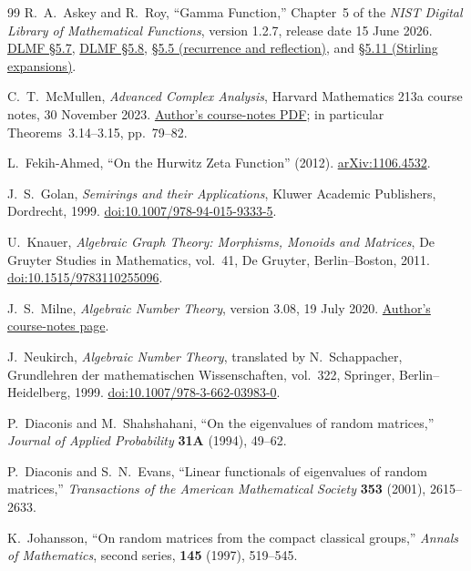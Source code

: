 \begin{thebibliography}{99}
R.~A.~Askey and R.~Roy,
\textquotedblleft{}Gamma Function,''
Chapter~5 of the \emph{NIST Digital Library of Mathematical Functions},
version 1.2.7, release date 15 June 2026.
\href{https://dlmf.nist.gov/5.7}{DLMF \S5.7},
\href{https://dlmf.nist.gov/5.8}{DLMF \S5.8},
\href{https://dlmf.nist.gov/5.5}{\S5.5 (recurrence and reflection)}, and
\href{https://dlmf.nist.gov/5.11}{\S5.11 (Stirling expansions)}.

C.~T.~McMullen,
\emph{Advanced Complex Analysis},
Harvard Mathematics 213a course notes, 30 November 2023.
\href{https://people.math.harvard.edu/~ctm/home/text/class/harvard/213a/23/html/home/course/course.pdf}
{Author's course-notes PDF}; in particular Theorems~3.14--3.15,
pp.~79--82.

L.~Fekih-Ahmed,
\textquotedblleft{}On the Hurwitz Zeta Function'' (2012).
\href{https://arxiv.org/abs/1106.4532}{arXiv:1106.4532}.

J.~S.~Golan,
\emph{Semirings and their Applications},
Kluwer Academic Publishers, Dordrecht, 1999.
\href{https://doi.org/10.1007/978-94-015-9333-5}{doi:10.1007/978-94-015-9333-5}.

U.~Knauer,
\emph{Algebraic Graph Theory: Morphisms, Monoids and Matrices},
De Gruyter Studies in Mathematics, vol.~41, De Gruyter, Berlin--Boston, 2011.
\href{https://doi.org/10.1515/9783110255096}{doi:10.1515/9783110255096}.

J.~S.~Milne,
\emph{Algebraic Number Theory}, version 3.08, 19 July 2020.
\href{https://www.jmilne.org/math/CourseNotes/ant.html}{Author's course-notes page}.

J.~Neukirch,
\emph{Algebraic Number Theory}, translated by N.~Schappacher,
Grundlehren der mathematischen Wissenschaften, vol.~322,
Springer, Berlin--Heidelberg, 1999.
\href{https://doi.org/10.1007/978-3-662-03983-0}{doi:10.1007/978-3-662-03983-0}.

P.~Diaconis and M.~Shahshahani,
``On the eigenvalues of random matrices,''
\emph{Journal of Applied Probability} \textbf{31A} (1994), 49--62.

P.~Diaconis and S.~N.~Evans,
``Linear functionals of eigenvalues of random matrices,''
\emph{Transactions of the American Mathematical Society} \textbf{353} (2001),
2615--2633.

K.~Johansson,
``On random matrices from the compact classical groups,''
\emph{Annals of Mathematics}, second series, \textbf{145} (1997), 519--545.


\end{thebibliography}
